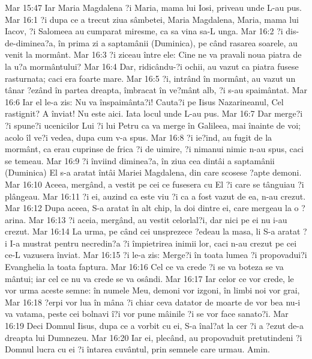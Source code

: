 Mar 15:47  Iar Maria Magdalena ?i Maria, mama lui Iosi, priveau unde L-au pus.
Mar 16:1  ?i dupa ce a trecut ziua sâmbetei, Maria Magdalena, Maria, mama lui Iacov, ?i Salomeea au cumparat miresme, ca sa vina sa-L unga.
Mar 16:2  ?i dis-de-diminea?a, în prima zi a saptamânii (Duminica), pe când rasarea soarele, au venit la mormânt.
Mar 16:3  ?i ziceau între ele: Cine ne va pravali noua piatra de la u?a mormântului?
Mar 16:4  Dar, ridicându-?i ochii, au vazut ca piatra fusese rasturnata; caci era foarte mare.
Mar 16:5  ?i, intrând în mormânt, au vazut un tânar ?ezând în partea dreapta, îmbracat în ve?mânt alb, ?i s-au spaimântat.
Mar 16:6  Iar el le-a zis: Nu va înspaimânta?i! Cauta?i pe Iisus Nazarineanul, Cel rastignit? A înviat! Nu este aici. Iata locul unde L-au pus.
Mar 16:7  Dar merge?i ?i spune?i ucenicilor Lui ?i lui Petru ca va merge în Galileea, mai înainte de voi; acolo îl ve?i vedea, dupa cum v-a spus.
Mar 16:8  ?i ie?ind, au fugit de la mormânt, ca erau cuprinse de frica ?i de uimire, ?i nimanui nimic n-au spus, caci se temeau.
Mar 16:9  ?i înviind diminea?a, în ziua cea dintâi a saptamânii (Duminica) El s-a aratat întâi Mariei Magdalena, din care scosese ?apte demoni.
Mar 16:10  Aceea, mergând, a vestit pe cei ce fusesera cu El ?i care se tânguiau ?i plângeau.
Mar 16:11  ?i ei, auzind ca este viu ?i ca a fost vazut de ea, n-au crezut.
Mar 16:12  Dupa aceea, S-a aratat în alt chip, la doi dintre ei, care mergeau la o ?arina.
Mar 16:13  ?i aceia, mergând, au vestit celorlal?i, dar nici pe ei nu i-au crezut.
Mar 16:14  La urma, pe când cei unsprezece ?edeau la masa, li S-a aratat ?i I-a mustrat pentru necredin?a ?i împietrirea inimii lor, caci n-au crezut pe cei ce-L vazusera înviat.
Mar 16:15  ?i le-a zis: Merge?i în toata lumea ?i propovadui?i Evanghelia la toata faptura.
Mar 16:16  Cel ce va crede ?i se va boteza se va mântui; iar cel ce nu va crede se va osândi.
Mar 16:17  Iar celor ce vor crede, le vor urma aceste semne: în numele Meu, demoni vor izgoni, în limbi noi vor grai,
Mar 16:18  ?erpi vor lua în mâna ?i chiar ceva datator de moarte de vor bea nu-i va vatama, peste cei bolnavi î?i vor pune mâinile ?i se vor face sanato?i.
Mar 16:19  Deci Domnul Iisus, dupa ce a vorbit cu ei, S-a înal?at la cer ?i a ?ezut de-a dreapta lui Dumnezeu.
Mar 16:20  Iar ei, plecând, au propovaduit pretutindeni ?i Domnul lucra cu ei ?i întarea cuvântul, prin semnele care urmau. Amin.


